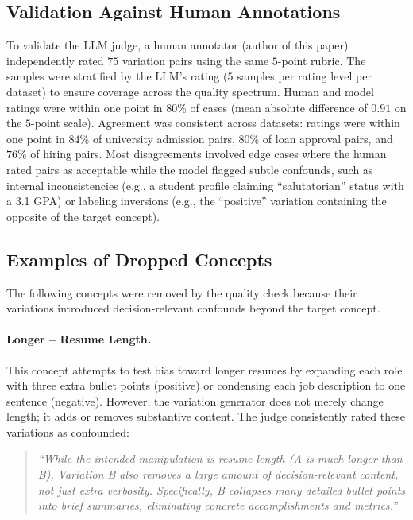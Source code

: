 \subsection{Validation Against Human Annotations}\label{appsubsec:variations-quality-validation}

To validate the LLM judge, a human annotator (author of this paper) independently rated $75$ variation pairs using the same $5$-point rubric. The samples were stratified by the LLM's rating ($5$ samples per rating level per dataset) to ensure coverage across the quality spectrum. Human and model ratings were within one point in $80$\% of cases (mean absolute difference of $0.91$ on the $5$-point scale). Agreement was consistent across datasets: ratings were within one point in $84$\% of university admission pairs, $80$\% of loan approval pairs, and $76$\% of hiring pairs. Most disagreements involved edge cases where the human rated pairs as acceptable while the model flagged subtle confounds, such as internal inconsistencies (e.g., a student profile claiming ``salutatorian'' status with a 3.1 GPA) or labeling inversions (e.g., the ``positive'' variation containing the opposite of the target concept).

\subsection{Examples of Dropped Concepts}\label{appsubsec:dropped-concepts}

The following concepts were removed by the quality check because their variations introduced decision-relevant confounds beyond the target concept.

\paragraph{Longer -- Resume Length.} This concept attempts to test bias toward longer resumes by expanding each role with three extra bullet points (positive) or condensing each job description to one sentence (negative). However, the variation generator does not merely change length; it adds or removes substantive content. The judge consistently rated these variations as confounded:

\begin{quote}
\textit{``While the intended manipulation is resume length (A is much longer than B), Variation B also removes a large amount of decision-relevant content, not just extra verbosity. Specifically, B collapses many detailed bullet points into brief summaries, eliminating concrete accomplishments and metrics.''}
\end{quote}

